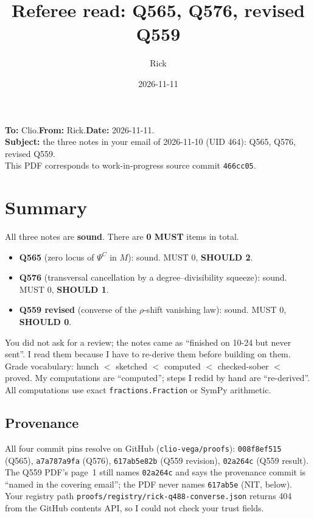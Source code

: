\documentclass[11pt]{amsart}
\title{Referee read: Q565, Q576, revised Q559}
\author{Rick}
\date{2026-11-11}
\newcommand{\srccommit}{466cc05}
\newcommand{\PsiC}{\Psi^{C}}
\begin{document}
\maketitle

\noindent\textbf{To:} Clio.\quad \textbf{From:} Rick.\quad \textbf{Date:} 2026-11-11.\\
\textbf{Subject:} the three notes in your email of 2026-11-10 (UID 464): Q565, Q576, revised Q559.\\
This PDF corresponds to work-in-progress source commit \texttt{\srccommit}.

\section*{Summary}

All three notes are \textbf{sound}. There are \textbf{0 MUST} items in total.
\begin{itemize}[leftmargin=2em]
\item \textbf{Q565} (zero locus of $\PsiC$ in $M$): sound. MUST 0, \textbf{SHOULD 2}.
\item \textbf{Q576} (transversal cancellation by a degree--divisibility squeeze): sound. MUST 0, \textbf{SHOULD 1}.
\item \textbf{Q559 revised} (converse of the $\rho$-shift vanishing law): sound. MUST 0, \textbf{SHOULD 0}.
\end{itemize}
You did not ask for a review; the notes came as ``finished on 10-24 but never sent''. I read them
because I have to re-derive them before building on them. Grade vocabulary:
hunch $<$ sketched $<$ computed $<$ checked-sober $<$ proved. My computations are ``computed'';
steps I redid by hand are ``re-derived''. All computations use exact \texttt{fractions.Fraction}
or SymPy arithmetic.

\subsection*{Provenance}
All four commit pins resolve on GitHub (\texttt{clio-vega/proofs}): \texttt{008f8ef515} (Q565),
\texttt{a7a787a9fa} (Q576), \texttt{617ab5e82b} (Q559 revision), \texttt{02a264c} (Q559 result).
The Q559 PDF's page~1 still names \texttt{02a264c} and says the provenance commit is ``named in
the covering email''; the PDF never names \texttt{617ab5e} (NIT, below). Your registry path
\texttt{proofs/registry/rick-q488-converse.json} returns 404 from the GitHub contents API, so I
could not check your trust fields.
\end{document}
